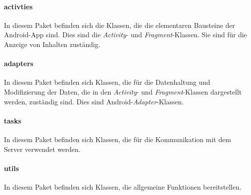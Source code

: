 \paragraph{activties} In diesem Paket befinden sich die Klassen, die die elementaren Bausteine der Android-App sind. Dies sind die \emph{Activity}- und \emph{Fragment}-Klassen. Sie sind für die Anzeige von Inhalten zuständig.
\paragraph{adapters} In diesem Paket befinden sich Klassen, die für die Datenhaltung und Modifizierung der Daten, die in den \emph{Activity}- und \emph{Fragment}-Klassen dargestellt werden, zuständig sind. Dies sind Android-\emph{Adapter}-Klassen.
\paragraph{tasks} In diesem Paket befinden sich Klassen, die für die Kommunikation mit dem Server verwendet werden.
\paragraph{utils} In diesem Paket befinden sich Klassen, die allgemeine Funktionen bereitstellen.
